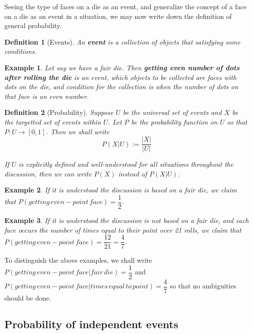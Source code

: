 \documentclass[12pt]{article}
\newtheorem{definition}{Definition}[section]
\newtheorem*{example}{Example}
\begin{document}
    Seeing the type of faces on a die as an event, and generalize the concept of a face on a die as an event in a situation, we may now write down the definition of general probability.

    \begin{definition}[Events]
        An \textbf{event} is a collection of objects that satisfying some conditions.
    \end{definition}

    \begin{example}
        Let say we have a fair die. Then \textbf{getting even number of dots after rolling the die} is an event, which objects to be collected are faces with dots on the die, and condition for the collection is when the number of dots on that face is an even number.
    \end{example}

    \begin{definition}[Probability]
        Suppose $U$ be the universal set of events and $X$ be the targetted set of events within $U$. Let $P$ be the probability function on $U$ so that $P:U\to [0,1]$. Then we shall write $$P(X|U):=\frac{|X|}{|U|}$$

        If $U$ is explicitly defined and well-understood for all situations throughout the discussion, then we can write $P(X)$ instead of $P(X|U)$.
    \end{definition}

    \begin{example}
        If it is understood the discussion is based on a fair die, we claim that $P(getting\, even-point\, face)=\dfrac{1}{2}$.
    \end{example}

    \begin{example}
        If it is understood the discussion is not based on a fair die, and each face occurs the number of times equal to their point over 21 rolls, we claim that $P(getting\, even-point\, face)=\dfrac{12}{21}=\dfrac{4}{7}$.
    \end{example}

    To distinguish the above examples, we shall write $P(getting\, even-point\, face|fair\, die)=\dfrac{1}{2}$ and $P(getting\, even-point\, face|times\, equal\, to\, point)=\dfrac{4}{7}$ so that no ambiguities should be done.

    \subsection{Probability of independent events}
\end{document}
